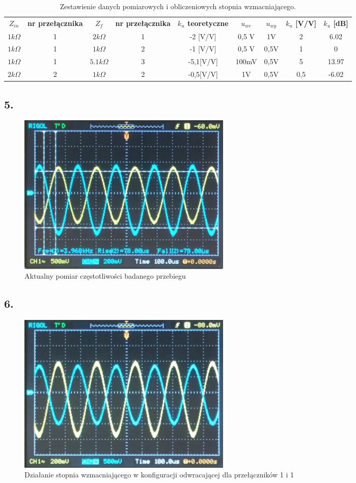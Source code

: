 \documentclass[polish,a4paper]{article}
\begin{document}
\begin{table}[!h]
\centering
\begin{tabular}{|c|c|c|c||c|c|c|c|c|}
\hline
\textbf{$Z_{in}$} & \textbf{nr przełącznika} & \textbf{$Z_f$} & \textbf{nr przełącznika} & \textbf{$k_u$ teoretyczne } & \textbf{$u_{we}$} & \textbf{$u_{wy}$} & \textbf{$k_u$ [V/V]} & \textbf{$k_u$ [dB] } \\ 
\hhline{|=|=|=|=#=|=|=|=|=|}
$1k\Omega$ & 1 & $2k\Omega$ & 1 & -2 [V/V] & 0,5 V & 1V & 2 & 6.02\\
\hline
$1k\Omega$ & 1 & $1k\Omega$ & 2 & -1 [V/V] & 0,5 V & 0,5V & 1 & 0\\
\hline
$1k\Omega$ & 1 & $5.1k\Omega$ & 3 & -5,1[V/V] & 100mV & 0,5V & 5 & 13.97\\
\hline
$2k\Omega$ & 2 & $1k\Omega$ & 2 & -0,5[V/V] & 1V & 0,5V & 0,5 & -6.02\\
\hline
\end{tabular}
\caption{Zestawienie danych pomiarowych i obliczeniowych stopnia wzmacniającego.}
\label{fig:dane_pomiarowe1}
\end{table}
\newpage

\subsection*{5.}
\begin{figure}[!h]
\centering
\includegraphics[width=0.5\textwidth]{czestotliwosc}
\caption{Aktualny pomiar częstotliwości badanego przebiegu}
\end{figure}
\subsection*{6.}
\begin{figure}[!h]
\centering
\includegraphics[width=0.5\textwidth]{k_odwracajaca}
\caption{Działanie stopnia wzmacniającego w konfiguracji odwracającej dla przełączników 1 i 1}
\end{figure}
\end{document}
